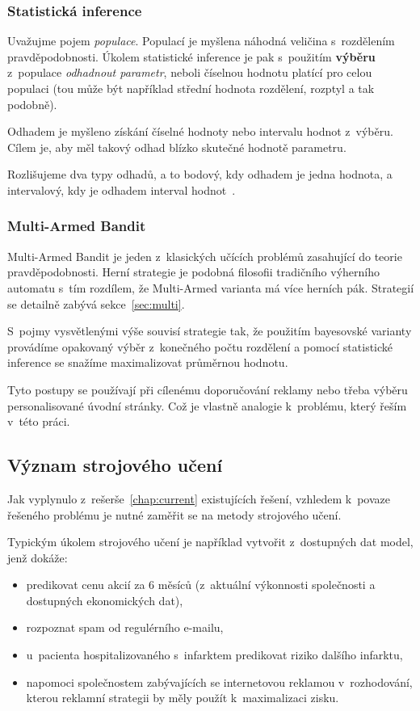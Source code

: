 \documentclass[thesis=M,czech]{FITthesis}[2014/05/07]
\begin{document}
\subsubsection{Statistická inference}
\label{inferno}
Uvažujme pojem \emph{populace}. Populací je myšlena náhodná veličina s~rozdělením pravděpodobnosti. Úkolem statistické inference je pak s~použitím \textbf{výběru} z~populace \emph{odhadnout parametr}, neboli číselnou hodnotu platící pro celou populaci (tou může být například střední hodnota rozdělení, rozptyl a tak podobně).

Odhadem je myšleno získání číselné hodnoty nebo intervalu hodnot z~výběru. Cílem je, aby měl takový odhad blízko skutečné hodnotě parametru.

Rozlišujeme dva typy odhadů, a to bodový, kdy odhadem je jedna hodnota, a intervalový, kdy je odhadem interval hodnot~\cite{pst5}. 

\subsubsection{Multi-Armed Bandit}
\label{sub:mabandit}
Multi-Armed Bandit je jeden z~klasických učících problémů zasahující do teorie pravděpodobnosti. Herní strategie je podobná filosofii tradičního výherního automatu s~tím rozdílem, že Multi-Armed varianta má více herních pák. Strategií se detailně zabývá sekce~\ref{sec:multi}.

S~pojmy vysvětlenými výše souvisí strategie tak, že použitím bayesovské varianty provádíme opakovaný výběr z~konečného počtu rozdělení a pomocí statistické inference se snažíme maximalizovat průměrnou hodnotu.

Tyto postupy se používají při cílenému doporučování reklamy nebo třeba výběru personalisované úvodní stránky. Což je vlastně analogie k~problému, který řeším v~této práci.

\subsection{Význam strojového učení}
\label{sec:machine}

Jak vyplynulo z~rešerše~\ref{chap:current} existujících řešení, vzhledem k~povaze řešeného problému je nutné zaměřit se na metody strojového učení. 

Typickým úkolem strojového učení je například vytvořit z~dostupných dat model, jenž dokáže:

\begin{itemize}
  \item predikovat cenu akcií za 6 měsíců (z~aktuální výkonnosti společnosti a dostupných ekonomických dat),
  \item rozpoznat spam od regulérního e-mailu,
  \item u~pacienta hospitalizovaného s~infarktem predikovat riziko dalšího infarktu,
  \item napomoci společnostem zabývajících se internetovou reklamou v~rozhodování, kterou reklamní strategii by měly použít k~maximalizaci zisku.
\end{itemize}
\end{document}

